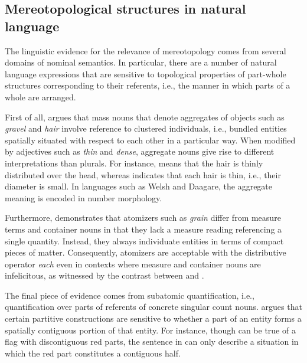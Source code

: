 \documentclass[output=paper]{langscibook}
\begin{document}
\subsection{Mereotopological structures in natural language}\label{wan:sec:mereotopological-structures-in-natural-language}

The linguistic evidence for the relevance of mereotopology comes from several domains of nominal semantics. In particular, there are a number of natural language expressions that are sensitive to topological properties of part-whole structures corresponding to their referents, i.e., the manner in which parts of a whole are arranged. 

First of all, \citet{grimm2012number} argues that mass nouns that denote aggregates of objects such as \textit{gravel} and \textit{hair} involve reference to clustered individuals, i.e., bundled entities spatially situated with respect to each other in a particular way. When modified by adjectives such as \textit{thin} and \textit{dense}, aggregate nouns give rise to different interpretations than plurals. For instance,  means that the hair is thinly distributed over the head, whereas  indicates that each hair is thin, i.e., their diameter is small. In languages such as Welsh and Daagare, the aggregate meaning is encoded in number morphology.

\ea {}\label{wan:ex:hair}
\label{wan:ex:hairs}
\z
\z

\noindent Furthermore, \citet{scontras2014semantics} demonstrates that atomizers such as \textit{grain} differ from measure terms and container nouns in that they lack a measure reading referencing a single quantity. Instead, they always individuate entities in terms of compact pieces of matter. Consequently, atomizers are acceptable with the distributive operator \textit{each} even in contexts where measure and container nouns are infelicitous, as witnessed by the contrast between  and .

\ea \judgewidth{\#}\label{wan:ex:atomizer}
\label{wan:ex:measure-container}
\z
\z

\noindent The final piece of evidence comes from subatomic quantification, i.e., quantification over parts of referents of concrete singular count nouns. \citet{wagiel2018subatomic} argues that certain partitive constructions are sensitive to whether a part of an entity forms a spatially contiguous portion of that entity. For instance, though  can be true of a flag with discontiguous red parts, the sentence in  can only describe a situation in which the red part constitutes a contiguous half.
\end{document}
